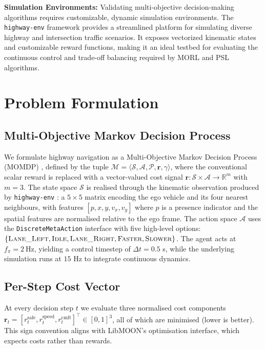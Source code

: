 \documentclass[12pt, letterpaper]{article}
\begin{document}
\textbf{Simulation Environments:} 
Validating multi-objective decision-making algorithms requires customizable, dynamic simulation environments. The \texttt{highway-env} framework \cite{leurent2018highway} provides a streamlined platform for simulating diverse highway and intersection traffic scenarios. It exposes vectorized kinematic states and customizable reward functions, making it an ideal testbed for evaluating the continuous control and trade-off balancing required by MORL and PSL algorithms.

\section{Problem Formulation}

\subsection{Multi-Objective Markov Decision Process}
We formulate highway navigation as a Multi-Objective Markov Decision Process (MOMDP) \cite{roijers2013survey,hayes2022practical}, defined by the tuple $\mathcal{M}=\langle \mathcal{S}, \mathcal{A}, \mathcal{P}, \bm{r}, \gamma \rangle$, where the conventional scalar reward is replaced with a vector-valued cost signal $\bm{r} : \mathcal{S} \times \mathcal{A} \to \mathbb{R}^m$ with $m = 3$. The state space $\mathcal{S}$ is realised through the kinematic observation produced by \texttt{highway-env} \cite{leurent2018highway}: a $5 \times 5$ matrix encoding the ego vehicle and its four nearest neighbours, with features $[p, x, y, v_x, v_y]$ where $p$ is a presence indicator and the spatial features are normalised relative to the ego frame. The action space $\mathcal{A}$ uses the \texttt{DiscreteMetaAction} interface with five high-level options: $\{\textsc{Lane\_Left}, \textsc{Idle}, \textsc{Lane\_Right}, \textsc{Faster}, \textsc{Slower}\}$. The agent acts at $f_{\pi} = 2~\text{Hz}$, yielding a control timestep of $\Delta t = 0.5$ s, while the underlying simulation runs at $15$ Hz to integrate continuous dynamics.

\subsection{Per-Step Cost Vector}
At every decision step $t$ we evaluate three normalised cost components $\bm{r}_t = [r_t^{\text{safe}}, r_t^{\text{speed}}, r_t^{\text{cmft}}]^{\top} \in [0,1]^3$, all of which are minimised (lower is better). This sign convention aligns with LibMOON's \cite{zhang2024libmoon} optimisation interface, which expects costs rather than rewards.
\end{document}
